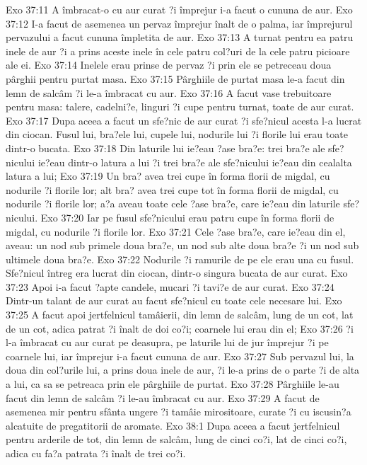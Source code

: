 Exo 37:11  A îmbracat-o cu aur curat ?i împrejur i-a facut o cununa de aur.
Exo 37:12  I-a facut de asemenea un pervaz împrejur înalt de o palma, iar împrejurul pervazului a facut cununa împletita de aur.
Exo 37:13  A turnat pentru ea patru inele de aur ?i a prins aceste inele în cele patru col?uri de la cele patru picioare ale ei.
Exo 37:14  Inelele erau prinse de pervaz ?i prin ele se petreceau doua pârghii pentru purtat masa.
Exo 37:15  Pârghiile de purtat masa le-a facut din lemn de salcâm ?i le-a îmbracat cu aur.
Exo 37:16  A facut vase trebuitoare pentru masa: talere, cadelni?e, linguri ?i cupe pentru turnat, toate de aur curat.
Exo 37:17  Dupa aceea a facut un sfe?nic de aur curat ?i sfe?nicul acesta l-a lucrat din ciocan. Fusul lui, bra?ele lui, cupele lui, nodurile lui ?i florile lui erau toate dintr-o bucata.
Exo 37:18  Din laturile lui ie?eau ?ase bra?e: trei bra?e ale sfe?nicului ie?eau dintr-o latura a lui ?i trei bra?e ale sfe?nicului ie?eau din cealalta latura a lui;
Exo 37:19  Un bra? avea trei cupe în forma florii de migdal, cu nodurile ?i florile lor; alt bra? avea trei cupe tot în forma florii de migdal, cu nodurile ?i florile lor; a?a aveau toate cele ?ase bra?e, care ie?eau din laturile sfe?nicului.
Exo 37:20  Iar pe fusul sfe?nicului erau patru cupe în forma florii de migdal, cu nodurile ?i florile lor.
Exo 37:21  Cele ?ase bra?e, care ie?eau din el, aveau: un nod sub primele doua bra?e, un nod sub alte doua bra?e ?i un nod sub ultimele doua bra?e.
Exo 37:22  Nodurile ?i ramurile de pe ele erau una cu fusul. Sfe?nicul întreg era lucrat din ciocan, dintr-o singura bucata de aur curat.
Exo 37:23  Apoi i-a facut ?apte candele, mucari ?i tavi?e de aur curat.
Exo 37:24  Dintr-un talant de aur curat au facut sfe?nicul cu toate cele necesare lui.
Exo 37:25  A facut apoi jertfelnicul tamâierii, din lemn de salcâm, lung de un cot, lat de un cot, adica patrat ?i înalt de doi co?i; coarnele lui erau din el;
Exo 37:26  ?i l-a îmbracat cu aur curat pe deasupra, pe laturile lui de jur împrejur ?i pe coarnele lui, iar împrejur i-a facut cununa de aur.
Exo 37:27  Sub pervazul lui, la doua din col?urile lui, a prins doua inele de aur, ?i le-a prins de o parte ?i de alta a lui, ca sa se petreaca prin ele pârghiile de purtat.
Exo 37:28  Pârghiile le-au facut din lemn de salcâm ?i le-au îmbracat cu aur.
Exo 37:29  A facut de asemenea mir pentru sfânta ungere ?i tamâie mirositoare, curate ?i cu iscusin?a alcatuite de pregatitorii de aromate.
Exo 38:1  Dupa aceea a facut jertfelnicul pentru arderile de tot, din lemn de salcâm, lung de cinci co?i, lat de cinci co?i, adica cu fa?a patrata ?i înalt de trei co?i.
